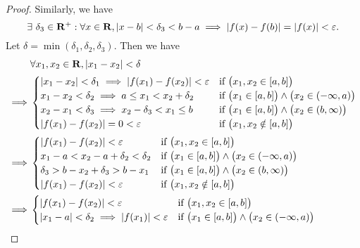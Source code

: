 \begin{proof}
  Similarly, we have
  \[
    \exists\ \delta_3 \in \mathbf{R}^+ : \forall x \in \mathbf{R}, \left\lvert x - b\right\rvert < \delta_3 < b - a \implies \left\lvert f(x) - f(b)\right\rvert = \left\lvert f(x)\right\rvert < \varepsilon.
  \]
  Let \(\delta = \min(\delta_1, \delta_2, \delta_3)\).
  Then we have
  \begin{align*}
             & \forall x_1, x_2 \in \mathbf{R}, \left\lvert x_1 - x_2\right\rvert < \delta                                                                                                          \\
    \implies & \begin{cases}
                 \left\lvert x_1 - x_2\right\rvert < \delta_1 \implies \left\lvert f(x_1) - f(x_2)\right\rvert < \varepsilon & \text{if } \big(x_1, x_2 \in [a, b]\big)                                 \\
                 x_1 - x_2 < \delta_2 \implies a \leq x_1 < x_2 + \delta_2               & \text{if } \big(x_1 \in [a, b]\big) \land \big(x_2 \in (-\infty, a)\big) \\
                 x_2 - x_1 < \delta_3 \implies x_2 - \delta_3 < x_1 \leq b               & \text{if } \big(x_1 \in [a, b]\big) \land \big(x_2 \in (b, \infty)\big)  \\
                 \left\lvert f(x_1) - f(x_2)\right\rvert = 0 < \varepsilon                                 & \text{if } \big(x_1, x_2 \notin [a, b]\big)
               \end{cases} \\
    \implies & \begin{cases}
                 \left\lvert f(x_1) - f(x_2)\right\rvert < \varepsilon     & \text{if } \big(x_1, x_2 \in [a, b]\big)                                 \\
                 x_1 - a < x_2 - a + \delta_2 < \delta_2 & \text{if } \big(x_1 \in [a, b]\big) \land \big(x_2 \in (-\infty, a)\big) \\
                 \delta_3 > b - x_2 + \delta_3 > b - x_1 & \text{if } \big(x_1 \in [a, b]\big) \land \big(x_2 \in (b, \infty)\big)  \\
                 \left\lvert f(x_1) - f(x_2)\right\rvert < \varepsilon     & \text{if } \big(x_1, x_2 \notin [a, b]\big)
               \end{cases}                                 \\
    \implies & \begin{cases}
                 \left\lvert f(x_1) - f(x_2)\right\rvert < \varepsilon                          & \text{if } \big(x_1, x_2 \in [a, b]\big)                                 \\
                 \left\lvert x_1 - a\right\rvert < \delta_2 \implies \left\lvert f(x_1)\right\rvert < \varepsilon & \text{if } \big(x_1 \in [a, b]\big) \land \big(x_2 \in (-\infty, a)\big) \\

\end{cases}
\end{align*}
\end{proof}
